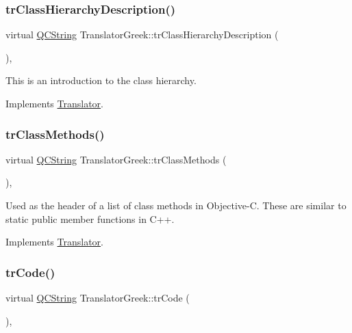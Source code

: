 \subsubsection{\texorpdfstring{trClassHierarchyDescription()}{trClassHierarchyDescription()}}
{\footnotesize\ttfamily virtual \mbox{\hyperlink{class_q_c_string}{Q\+C\+String}} Translator\+Greek\+::tr\+Class\+Hierarchy\+Description (\begin{DoxyParamCaption}{ }\end{DoxyParamCaption})\hspace{0.3cm}{\ttfamily [inline]}, {\ttfamily [virtual]}}

This is an introduction to the class hierarchy. 

Implements \mbox{\hyperlink{class_translator}{Translator}}.

\mbox{\label{class_translator_greek_ace6f4bf3a4694cc004b7d64bdb267010}} 
\subsubsection{\texorpdfstring{trClassMethods()}{trClassMethods()}}
{\footnotesize\ttfamily virtual \mbox{\hyperlink{class_q_c_string}{Q\+C\+String}} Translator\+Greek\+::tr\+Class\+Methods (\begin{DoxyParamCaption}{ }\end{DoxyParamCaption})\hspace{0.3cm}{\ttfamily [inline]}, {\ttfamily [virtual]}}

Used as the header of a list of class methods in Objective-\/C. These are similar to static public member functions in C++. 

Implements \mbox{\hyperlink{class_translator}{Translator}}.

\mbox{\label{class_translator_greek_a9c126d8fef6827918e098bbbf06aaf1d}} 
\subsubsection{\texorpdfstring{trCode()}{trCode()}}
{\footnotesize\ttfamily virtual \mbox{\hyperlink{class_q_c_string}{Q\+C\+String}} Translator\+Greek\+::tr\+Code (\begin{DoxyParamCaption}{ }\end{DoxyParamCaption})\hspace{0.3cm}{\ttfamily [inline]}, {\ttfamily [virtual]}}

